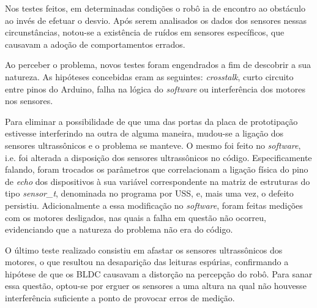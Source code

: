 Nos testes feitos, em determinadas condições o robô ia de encontro ao obstáculo ao invés de efetuar o desvio. 
Após serem analisados os dados dos sensores nessas circunstâncias, notou-se a existência de ruídos em sensores específicos, que causavam a adoção de 
comportamentos errados.

Ao perceber o problema, novos testes foram engendrados a fim de descobrir a sua natureza. 
As hipóteses concebidas eram as seguintes: \textit{crosstalk}, curto circuito entre pinos do Arduino, falha na lógica do \textit{software} ou 
interferência dos motores nos sensores.

Para eliminar a possibilidade de que uma das portas da placa de prototipação estivesse interferindo na outra de alguma maneira, mudou-se a 
ligação dos sensores ultrassônicos e o problema se manteve.
O mesmo foi feito no \textit{software}, i.e. foi alterada a disposição dos sensores ultrassônicos no código. 
Especificamente falando, foram trocados os parâmetros que correlacionam a ligação física do pino de \textit{echo} dos dispositivos à sua variável 
correspondente na matriz de estruturas do tipo \textit{sensor\_t}, denominada no programa por USS, e, mais uma vez, o defeito persistiu.
Adicionalmente a essa modificação no \textit{software}, foram feitas medições com os motores desligados, nas quais a falha em questão não ocorreu, 
evidenciando que a natureza do problema não era do código.

O último teste realizado consistiu em afastar os sensores ultrassônicos dos motores, o que resultou na desaparição das leituras espúrias, confirmando 
a hipótese de que os BLDC causavam a distorção na percepção do robô.
Para sanar essa questão, optou-se por erguer os sensores a uma altura na qual não houvesse interferência suficiente a ponto de provocar erros de 
medição.